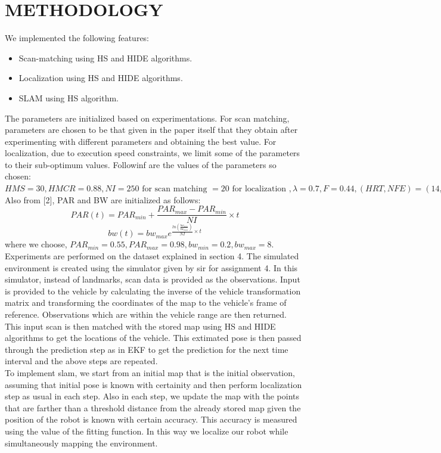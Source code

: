 \documentclass[letterpaper, 10 pt, conference]{ieeeconf}  %
\begin{document}
\section{METHODOLOGY}
We implemented the following features:
\begin{itemize}
\item Scan-matching using HS and HIDE algorithms.
\item Localization using HS and HIDE algorithms.
\item SLAM using HS algorithm.
\end{itemize}
The parameters are initialized based on experimentations. For scan matching, parameters are chosen to be that given in the paper itself that they obtain after experimenting with different parameters and obtaining the best value. For localization, due to execution speed constraints, we limit some of the parameters to their sub-optimum values. Followinf are the values of the parameters so chosen:\\ $HMS = 30, HMCR = 0.88, NI = 250 \text{ for scan matching } = 20 \text{ for localization }, \lambda = 0.7, F = 0.44,(HRT, NFE) = (14, 220) \text{ for scan matching } = (4, 20) \text{ for localization }$\\ Also from [2], PAR and BW are initialized as follows: \[PAR(t) = PAR_{min}+\frac{PAR_{max}-PAR_{min}}{NI}\times t\] \[bw(t) = bw_{max}e^{\frac{ln(\frac{bw_{min}}{bw_{max}})}{NI}\times t}\] where we choose, $PAR_{min} = 0.55 , PAR_{max}=0.98, bw_{min}=0.2, bw_{max}=8$.\vspace*{1.5mm}\\
\indent Experiments are performed on the dataset explained in section 4. The simulated environment is created using the simulator given by sir for assignment 4. In this simulator, instead of landmarks, scan data is provided as the observations. Input is provided to the vehicle by calculating the inverse of the vehicle transformation matrix and transforming the coordinates of the map to the vehicle's frame of reference. Observations which are within the vehicle range are then returned. This input scan is then matched with the stored map using HS and HIDE algorithms to get the locations of the vehicle. This extimated pose is then passed through the prediction step as in EKF to get the prediction for the next time interval and the above steps are repeated.\vspace*{1mm}\\
\indent To implement slam, we start from an initial map that is the initial observation, assuming that initial pose is known with certainity and then perform localization step as usual in each step. Also in each step, we update the map with the points that are farther than a threshold distance from the already stored map given the position of the robot is known with certain accuracy. This accuracy is measured using the value of the fitting function. In this way we localize our robot while simultaneously mapping the environment.
\end{document}
